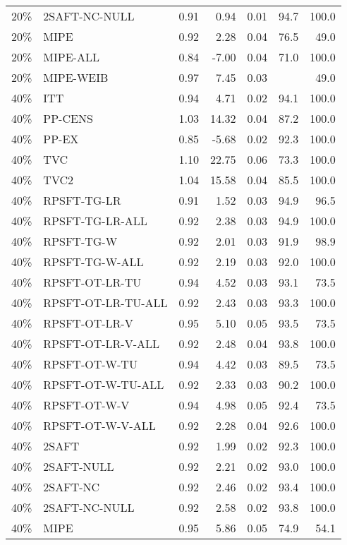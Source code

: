 \begin{table}[ht]
{\begin{tabular}{llrrrrr}
  20\% & 2SAFT-NC-NULL & 0.91 & 0.94 & 0.01 & 94.7 & 100.0 \\ 
  20\% & MIPE & 0.92 & 2.28 & 0.04 & 76.5 & 49.0 \\ 
  20\% & MIPE-ALL & 0.84 & -7.00 & 0.04 & 71.0 & 100.0 \\ 
  20\% & MIPE-WEIB & 0.97 & 7.45 & 0.03 &  & 49.0 \\ 
   \hline
40\% & ITT & 0.94 & 4.71 & 0.02 & 94.1 & 100.0 \\ 
  40\% & PP-CENS & 1.03 & 14.32 & 0.04 & 87.2 & 100.0 \\ 
  40\% & PP-EX & 0.85 & -5.68 & 0.02 & 92.3 & 100.0 \\ 
  40\% & TVC & 1.10 & 22.75 & 0.06 & 73.3 & 100.0 \\ 
  40\% & TVC2 & 1.04 & 15.58 & 0.04 & 85.5 & 100.0 \\ 
   \hline
40\% & RPSFT-TG-LR & 0.91 & 1.52 & 0.03 & 94.9 & 96.5 \\ 
  40\% & RPSFT-TG-LR-ALL & 0.92 & 2.38 & 0.03 & 94.9 & 100.0 \\ 
  40\% & RPSFT-TG-W & 0.92 & 2.01 & 0.03 & 91.9 & 98.9 \\ 
  40\% & RPSFT-TG-W-ALL & 0.92 & 2.19 & 0.03 & 92.0 & 100.0 \\ 
  40\% & RPSFT-OT-LR-TU & 0.94 & 4.52 & 0.03 & 93.1 & 73.5 \\ 
  40\% & RPSFT-OT-LR-TU-ALL & 0.92 & 2.43 & 0.03 & 93.3 & 100.0 \\ 
  40\% & RPSFT-OT-LR-V & 0.95 & 5.10 & 0.05 & 93.5 & 73.5 \\ 
  40\% & RPSFT-OT-LR-V-ALL & 0.92 & 2.48 & 0.04 & 93.8 & 100.0 \\ 
   \hline
40\% & RPSFT-OT-W-TU & 0.94 & 4.42 & 0.03 & 89.5 & 73.5 \\ 
  40\% & RPSFT-OT-W-TU-ALL & 0.92 & 2.33 & 0.03 & 90.2 & 100.0 \\ 
  40\% & RPSFT-OT-W-V & 0.94 & 4.98 & 0.05 & 92.4 & 73.5 \\ 
  40\% & RPSFT-OT-W-V-ALL & 0.92 & 2.28 & 0.04 & 92.6 & 100.0 \\ 
   \hline
40\% & 2SAFT & 0.92 & 1.99 & 0.02 & 92.3 & 100.0 \\ 
  40\% & 2SAFT-NULL & 0.92 & 2.21 & 0.02 & 93.0 & 100.0 \\ 
  40\% & 2SAFT-NC & 0.92 & 2.46 & 0.02 & 93.4 & 100.0 \\ 
  40\% & 2SAFT-NC-NULL & 0.92 & 2.58 & 0.02 & 93.8 & 100.0 \\ 
  40\% & MIPE & 0.95 & 5.86 & 0.05 & 74.9 & 54.1 \\ 

\end{tabular}}
\end{table}
